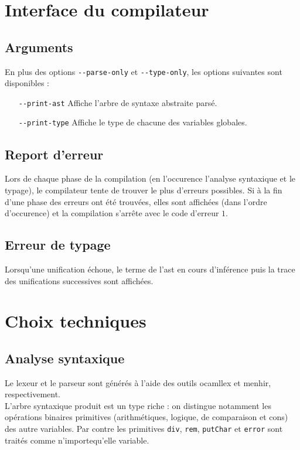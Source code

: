 \documentclass[a4paper]{article}
\begin{document}
\section{Interface du compilateur}

\subsection{Arguments}
En plus des options \texttt{-{}-parse-only} et \texttt{-{}-type-only}, les options suivantes sont disponibles :
\begin{itemize}
\item[\texttt{-{}-print-ast}] Affiche l'arbre de syntaxe abstraite parsé.
\item[\texttt{-{}-print-type}] Affiche le type de chacune des variables globales.
\end{itemize}

\subsection{Report d'erreur}
Lors de chaque phase de la compilation (en l'occurence l'analyse syntaxique et le typage), le compilateur tente de trouver le plus d'erreurs possibles. Si à la fin d'une phase des erreurs ont été trouvées, elles sont affichées (dans l'ordre d'occurence) et la compilation s'arrête avec le code d'erreur $1$.

\subsection{Erreur de typage}
Lorsqu'une unification échoue, le terme de l'ast en cours d'inférence puis la trace des unifications successives sont affichées.

\section{Choix techniques}
\subsection{Analyse syntaxique}
Le lexeur et le parseur sont générés à l'aide des outils ocamllex et menhir, respectivement. \\
L'arbre syntaxique produit est un type riche : on distingue notamment les opérations binaires primitives (arithmétiques, logique, de comparaison et cons) des autre variables. Par contre les primitives \texttt{div}, \texttt{rem}, \texttt{putChar} et \texttt{error} sont traités comme n'importequ'elle variable.
\end{document}
